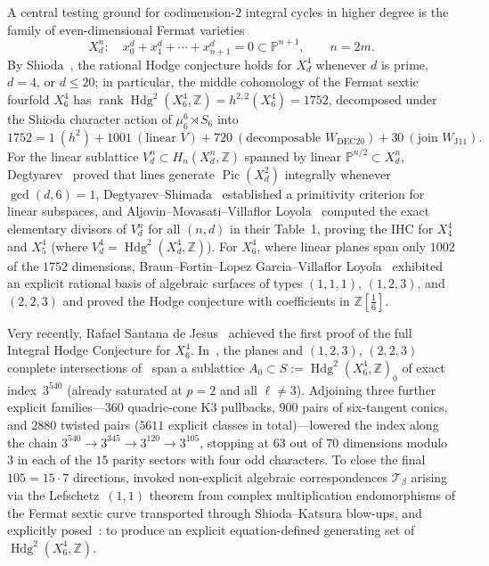 \documentclass[11pt,a4paper]{amsart}
\theoremstyle{definition}
\newcommand{\ZZ}{\mathbb{Z}}
\newcommand{\PP}{\mathbb{P}}
\newcommand{\Hdg}{\operatorname{Hdg}}
\newcommand{\Pic}{\operatorname{Pic}}
\newcommand{\rank}{\operatorname{rank}}
\begin{document}
A central testing ground for codimension-$2$ integral cycles in higher degree is the family of even-dimensional Fermat varieties
\[
  X_d^n : \quad x_0^d + x_1^d + \cdots + x_{n+1}^d = 0 \subset \PP^{n+1}, \qquad n = 2m.
\]
By Shioda~\cite{Shi79}, the rational Hodge conjecture holds for $X_d^4$ whenever $d$ is prime, $d = 4$, or $d \le 20$; in particular, the middle cohomology of the Fermat sextic fourfold $X_6^4$ has $\rank \Hdg^2(X_6^4, \ZZ) = h^{2,2}(X_6^4) = 1752$, decomposed under the Shioda character action of $\mu_6^6 \rtimes S_6$ into
\[
  1752 = 1\ (h^2) + 1001\ (\text{linear } V) + 720\ (\text{decomposable } W_{\mathrm{DEC20}}) + 30\ (\text{join } W_{\mathrm{J11}}).
\]
For the linear sublattice $V_d^n \subset H_n(X_d^n, \ZZ)$ spanned by linear $\PP^{n/2} \subset X_d^n$, Degtyarev~\cite{Deg15} proved that lines generate $\Pic(X_d^2)$ integrally whenever $\gcd(d, 6) = 1$, Degtyarev--Shimada~\cite{DS16} established a primitivity criterion for linear subspaces, and Aljovin--Movasati--Villaflor Loyola~\cite{AMVL19} computed the exact elementary divisors of $V_d^n$ for all $(n, d)$ in their Table~1, proving the IHC for $X_4^4$ and $X_5^4$ (where $V_d^4 = \Hdg^2(X_d^4, \ZZ)$).
For $X_6^4$, where linear planes span only $1002$ of the $1752$ dimensions, Braun--Fortin--Lopez Garcia--Villaflor Loyola~\cite{BFLGVL24} exhibited an explicit rational basis of algebraic surfaces of types $(1,1,1)$, $(1,2,3)$, and $(2,2,3)$ and proved the Hodge conjecture with coefficients in $\ZZ[\tfrac{1}{6}]$.

Very recently, Rafael Santana de Jesus~\cite{SdJ26} achieved the first proof of the full Integral Hodge Conjecture for $X_6^4$.
In~\cite{SdJ26}, the planes and $(1,2,3)$, $(2,2,3)$ complete intersections of~\cite{BFLGVL24} span a sublattice $A_0 \subset S := \Hdg^2(X_6^4, \ZZ)_0$ of exact index~$3^{540}$ (already saturated at $p = 2$ and all $\ell \ne 3$).
Adjoining three further explicit families---$360$ quadric-cone K3 pullbacks, $900$ pairs of six-tangent conics, and $2880$ twisted pairs ($5611$ explicit classes in total)---lowered the index along the chain $3^{540} \to 3^{345} \to 3^{120} \to 3^{105}$, stopping at $63$ out of $70$ dimensions modulo~$3$ in each of the $15$ parity sectors with four odd characters.
To close the final $105 = 15 \cdot 7$ directions, \cite{SdJ26} invoked non-explicit algebraic correspondences $\mathcal{T}_\beta$ arising via the Lefschetz~$(1,1)$ theorem from complex multiplication endomorphisms of the Fermat sextic curve transported through Shioda--Katsura blow-ups, and explicitly posed~\cite[Remark~8(1)]{SdJ26}: to produce an explicit equation-defined generating set of $\Hdg^2(X_6^4, \ZZ)$.
\end{document}
